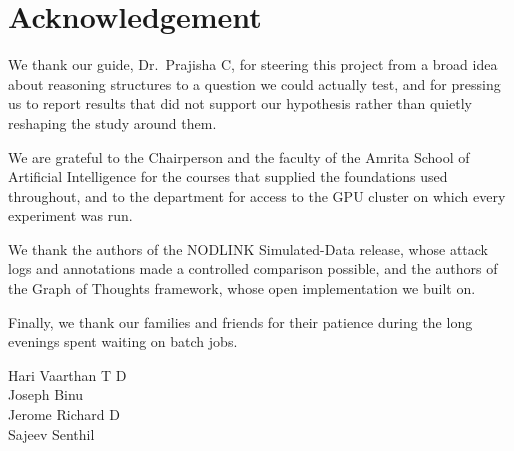 \chapter*{Acknowledgement}

We thank our guide, Dr.\ Prajisha C, for steering this project from a broad idea about reasoning structures to a question we could actually test, and for pressing us to report results that did not support our hypothesis rather than quietly reshaping the study around them.

We are grateful to the Chairperson and the faculty of the Amrita School of Artificial Intelligence for the courses that supplied the foundations used throughout, and to the department for access to the GPU cluster on which every experiment was run.

We thank the authors of the NODLINK Simulated-Data release, whose attack logs and annotations made a controlled comparison possible, and the authors of the Graph of Thoughts framework, whose open implementation we built on.

Finally, we thank our families and friends for their patience during the long evenings spent waiting on batch jobs.

\vspace{0.5in}
\begin{flushright}
Hari Vaarthan T D\\
Joseph Binu\\
Jerome Richard D\\
Sajeev Senthil
\end{flushright}
